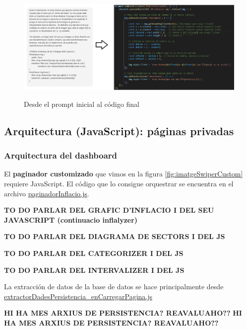 \documentclass[a4paper,12pt]{report}
\begin{document}
	\begin{figure}[H]
		\centering
		\caption{Desde el prompt inicial al código final}
		\includegraphics[width=1\linewidth]{img/promptScriptDropShadow}
		\label{fig:promptScriptDropShadow}
	\end{figure}
	
	
	\subsection{Arquitectura (JavaScript): páginas privadas}
	
	\subsubsection{Arquitectura del dashboard}
	\label{sec:paginadorJavascriptArquitectura}
	
	El \textbf{paginador customizado} que vimos en la figura \ref{fig:imatgeSwiperCustom} requiere JavaScript. El código que lo consigue orquestrar se encuentra en el archivo \href{https://github.com/blackcub3s/mercApp/blob/main/APP%20WEB/__frontend__produccio__/app/js/dashboard/paginadorInflacio.js}{paginadorInflacio.js}.
	
	\textbf{TO DO PARLAR DEL GRAFIC D'INFLACIO I DEL SEU JAVASCRIPT (continuacio inflalyzer)}
	
	\textbf{TO DO PARLAR DEL DIAGRAMA DE SECTORS I DEL JS}
	
	\textbf{TO DO PARLAR DEL CATEGORIZER I DEL JS}
	
	\textbf{TO DO PARLAR DEL INTERVALIZER I DEL JS}
	
	
	
	La extracción de datos de la base de datos se hace principalmente desde \href{	https://github.com/blackcub3s/mercApp/blob/main/APP%20WEB/__frontend__produccio__/app/js/dashboard/extractorDadesPersistencia_enCarregarPagina.js}{extractorDadesPersistencia\_enCarregarPagina.js}
	
	\textbf{HI HA MES ARXIUS DE PERSISTENCIA? REAVALUAHO??}
		\textbf{HI HA MES ARXIUS DE PERSISTENCIA? REAVALUAHO??}
	
\end{document}
